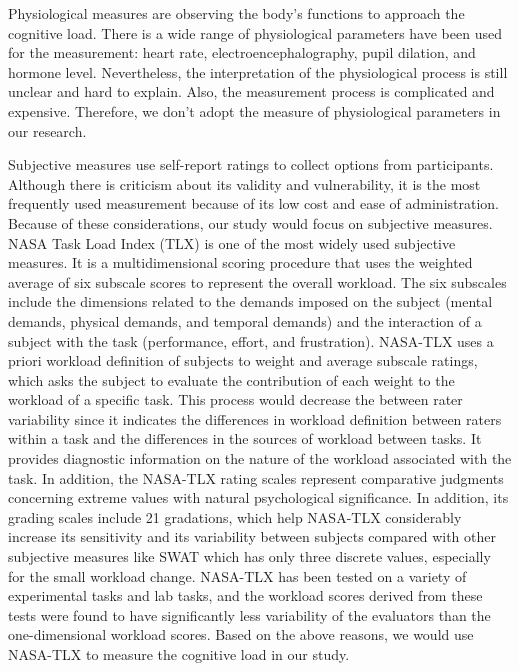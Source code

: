 Physiological measures are observing the body’s functions to approach the cognitive load.\cite{chen2017construct} There is a wide range of physiological parameters have been used for the measurement: heart rate, electroencephalography, pupil dilation, and hormone level.\cite{klepsch2017development} Nevertheless, the interpretation of the physiological process is still unclear and hard to explain.\cite{klepsch2017development} Also, the measurement process is complicated and expensive. Therefore, we don’t adopt the measure of physiological parameters in our research.\cite{klepsch2017development, brunken2002assessment}

Subjective measures use self-report ratings to collect options from participants.\cite{brunken2010measuring} Although there is criticism about its validity and vulnerability, it is the most frequently used measurement because of its low cost and ease of administration. Because of these considerations, our study would focus on subjective measures.\cite{ramkumar2017using} NASA Task Load Index (TLX) is one of the most widely used subjective measures. It is a multidimensional scoring procedure that uses the weighted average of six subscale scores to represent the overall workload. The six subscales include the dimensions related to the demands imposed on the subject (mental demands, physical demands, and temporal demands) and the interaction of a subject with the task (performance, effort, and frustration).\cite{hart1988development, hart2006nasa, cain2007review} NASA-TLX uses a priori workload definition of subjects to weight and average subscale ratings, which asks the subject to evaluate the contribution of each weight to the workload of a specific task.\cite{hart1988development} This process would decrease the between rater variability since it indicates the differences in workload definition between raters within a task and the differences in the sources of workload between tasks.\cite{cain2007review} \cite{dey2010sensitivity} It provides diagnostic information on the nature of the workload associated with the task. In addition, the NASA-TLX rating scales represent comparative judgments concerning extreme values with natural psychological significance.\cite{hart1988development} In addition, its grading scales include 21 gradations, which help NASA-TLX considerably increase its sensitivity and its variability between subjects compared with other subjective measures like SWAT which has only three discrete values, especially for the small workload change. \cite{rubio2004evaluation}\cite{galy2012relationship} NASA-TLX has been tested on a variety of experimental tasks and lab tasks, and the workload scores derived from these tests were found to have significantly less variability of the evaluators than the one-dimensional workload scores. Based on the above reasons, we would use NASA-TLX to measure the cognitive load in our study.